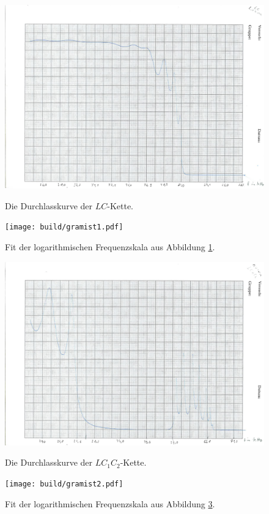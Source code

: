    \begin{figure}
   	\centering
   	\caption{Die Durchlasskurve der $LC$-Kette.}
   	\includegraphics[width=\linewidth-70pt,height=\textheight-70pt,keepaspectratio]{content/Scans/LC.png}
   	\label{fig:Lc}
   \end{figure}
   \begin{figure}
   	\centering
   	\caption{Fit der logarithmischen Frequenzskala aus Abbildung \ref{fig:Lc}.}
   	\texttt{[image: build/gramist1.pdf]}
   	\label{fig:LcMist}
   \end{figure}
	\begin{figure}
		\centering
		\caption{Die Durchlasskurve der $LC_1C_2$-Kette.}
		\includegraphics[width=\linewidth-70pt,height=\textheight-70pt,keepaspectratio]{content/Scans/LC1C2.png}
		\label{fig:Lc1c2}
	\end{figure}
	\begin{figure}
		\centering
		\caption{Fit der logarithmischen Frequenzskala aus Abbildung \ref{fig:Lc1c2}.}
		\texttt{[image: build/gramist2.pdf]}
		\label{fig:Lc1c2Mist}
	\end{figure}

